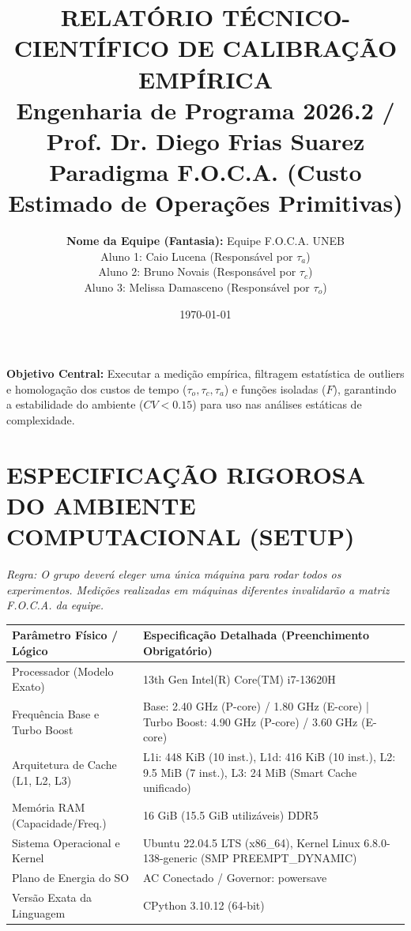 \documentclass[10pt,a4paper]{article}
\title{\textbf{RELATÓRIO TÉCNICO-CIENTÍFICO DE CALIBRAÇÃO EMPÍRICA}\\\large Engenharia de Programa 2026.2 / Prof. Dr. Diego Frias Suarez\\\normalsize Paradigma F.O.C.A. (Custo Estimado de Operações Primitivas)}
\author{\textbf{Nome da Equipe (Fantasia):} Equipe F.O.C.A. UNEB \\
Aluno 1: Caio Lucena (Responsável por $\tau_a$) \\
Aluno 2: Bruno Novais (Responsável por $\tau_c$) \\
Aluno 3: Melissa Damasceno (Responsável por $\tau_o$)}
\date{\today}
\begin{document}
\maketitle

\noindent\textbf{Objetivo Central:} Executar a medição empírica, filtragem estatística de outliers e homologação dos custos de tempo ($\tau_o, \tau_c, \tau_a$) e funções isoladas ($F$), garantindo a estabilidade do ambiente ($CV < 0.15$) para uso nas análises estáticas de complexidade.

\section{ESPECIFICAÇÃO RIGOROSA DO AMBIENTE COMPUTACIONAL (SETUP)}
\noindent\textit{Regra: O grupo deverá eleger uma única máquina para rodar todos os experimentos. Medições realizadas em máquinas diferentes invalidarão a matriz F.O.C.A. da equipe.}\\[0.2cm]
\begin{table}[H]
\centering\small
\begin{tabularx}{\textwidth}{lX}
\toprule
\textbf{Parâmetro Físico / Lógico} & \textbf{Especificação Detalhada (Preenchimento Obrigatório)} \\ \midrule
Processador (Modelo Exato) & 13th Gen Intel(R) Core(TM) i7-13620H \\
Frequência Base e Turbo Boost & Base: 2.40 GHz (P-core) / 1.80 GHz (E-core) | Turbo Boost: 4.90 GHz (P-core) / 3.60 GHz (E-core) \\
Arquitetura de Cache (L1, L2, L3) & L1i: 448 KiB (10 inst.), L1d: 416 KiB (10 inst.), L2: 9.5 MiB (7 inst.), L3: 24 MiB (Smart Cache unificado) \\
Memória RAM (Capacidade/Freq.) & 16 GiB (15.5 GiB utilizáveis) DDR5 \\
Sistema Operacional e Kernel & Ubuntu 22.04.5 LTS (x86\_64), Kernel Linux 6.8.0-138-generic (SMP PREEMPT\_DYNAMIC) \\
Plano de Energia do SO & AC Conectado / Governor: powersave \\
Versão Exata da Linguagem & CPython 3.10.12 (64-bit) \\
\bottomrule
\end{tabularx}
\end{table}
\end{document}
